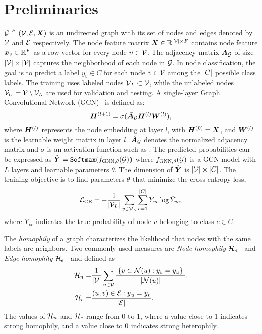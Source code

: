 \section{Preliminaries}
\label{sec:prelim}
${\mathcal{G}} \triangleq ({\mathcal{V}}, {\mathcal{E}}, {\bm{X}})$ is an undirected graph with its set of nodes and edges denoted by ${\mathcal{V}}$ and ${\mathcal{E}}$ respectively.  The node feature matrix ${\bm{X}} \in \mathbb{R}^{|{\mathcal{V}}| \times F}$ contains node feature ${\bm{x}}_v \in \mathbb{R}^F$ as a row vector for every node $v \in {\mathcal{V}}$. The adjacency matrix ${\bm{A}}_{{\mathcal{G}}}$ of size $|{\mathcal{V}}| \times |{\mathcal{V}}|$ captures the neighborhood of each node in ${\mathcal{G}}$. In node classification, the goal is to predict a label $y_v \in C$ for each node $v \in {\mathcal{V}}$ among the $\lvert C\rvert$ possible class labels. The training uses labeled nodes ${\mathcal{V}}_L \subset {\mathcal{V}}$, while the unlabeled nodes ${\mathcal{V}}_U = {\mathcal{V}} \setminus {\mathcal{V}}_L$ are used for validation and testing. A single-layer Graph Convolutional Network (GCN)~\cite{kipf2016semi} is defined as:
\begin{equation}
{\bm{H}}^{(l+1)} = \sigma(\hat{{\bm{A}}}_{\mathcal{G}}{\bm{H}}^{(l)}{\bm{W}}^{(l)}),
\label{eq:gcnlayer}
\end{equation}
where ${\bm{H}}^{(l)}$ represents the node embedding at layer $l$, with ${\bm{H}}^{(0)}={\bm{X}}$, and ${\bm{W}}^{(l)}$ is the learnable weight matrix in layer $l$. $\hat{{\bm{A}}}_{\mathcal{G}}$ denotes the normalized adjacency matrix and $\sigma$ is an activation function such as \relu. The predicted probabilities can be expressed as
$\hat{{\bm{Y}}} = \texttt{Softmax}(f_{\text{GNN}, \theta}({\mathcal{G}}))$ where $f_{\text{GNN}, \theta}({\mathcal{G}})$ is a GCN model with $L$ layers and learnable parameters $\theta$. The dimension of $\hat{{\bm{Y}}}$ is $|{\mathcal{V}}| \times \lvert C\rvert$. The training objective is to find parameters $\theta$ that minimize the cross-entropy loss,
\vspace{-6pt}
\begin{equation}
\label{eq:loss}
\mathcal{L}_\mathrm{CE} = - \frac{1}{|{\mathcal{V}}_L|} \sum_{v \in {\mathcal{V}}_L} \sum_{c = 1}^{\lvert C\rvert} Y_{vc} \log \hat{Y}_{vc},
\end{equation}
where $Y_{vc}$ indicates the true probability of node $v$ belonging to class $c \in C$. 

The \emph{homophily} of a graph characterizes the likelihood that nodes with the same labels are neighbors. Two commonly used measures are \emph{Node homophily} ${\mathcal{H}}_n$~\citep{pei2020geom} and \emph{Edge homophily} ${\mathcal{H}}_e$~\cite{zhu2020beyond} and defined as
\vspace{-3pt}
\begin{align}
{\mathcal{H}}_{n} = & \frac{1}{|{\mathcal{V}}|} \sum_{u\in {\mathcal{V}}} \frac{| \{v\in {\mathcal{N}}(u) : y_v = y_u\}|}{|{\mathcal{N}}(u)|},\\
{\mathcal{H}}_{e} = & \frac{(u,v)\in {\mathcal{E}}: y_u = y_v}{|{\mathcal{E}}|}.
\end{align}\vspace{-3pt}
The values of ${\mathcal{H}}_n$ and ${\mathcal{H}}_e$ range from $0$ to $1$, where a value close to $1$ indicates strong homophily, and a value close to $0$ indicates strong heterophily.
% 


